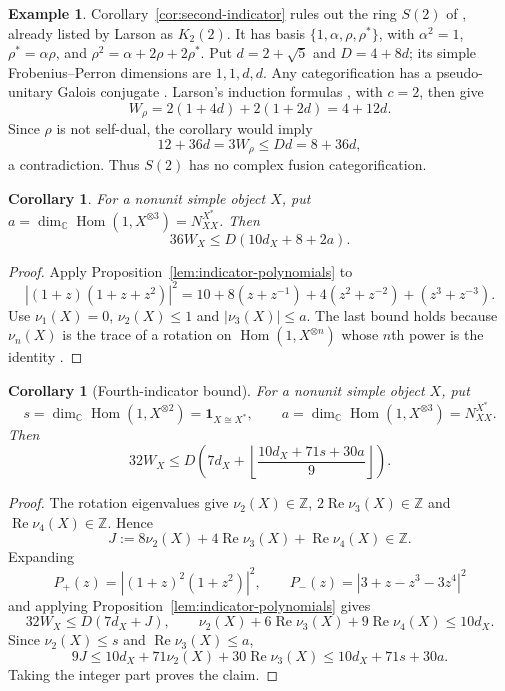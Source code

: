 \documentclass[11pt]{amsart}
\newtheorem{corollary}[theorem]{Corollary}
\theoremstyle{definition}
\newtheorem{example}[theorem]{Example}
\newcommand{\C}{\mathbb C}
\newcommand{\Z}{\mathbb Z}
\numberwithin{equation}{section}
\begin{document}
\begin{example}\label{ex:S(2)}
Corollary~\ref{cor:second-indicator} rules out the ring $S(2)$ of
\cite[\S4, Theorem~4.1]{EIP}, already listed by Larson
\cite[Theorem~1.1(6)]{Larson} as $K_2(2)$. It has basis
$\{1,\alpha,\rho,\rho^*\}$, with
$\alpha^2=1$, $\rho^*=\alpha\rho$, and
$\rho^2=\alpha+2\rho+2\rho^*$.
Put $d=2+\sqrt5$ and $D=4+8d$; its simple Frobenius--Perron
dimensions are $1,1,d,d$. Any categorification has a pseudo-unitary
Galois conjugate \cite[Lemma~3.1]{Schopieray}. Larson's induction
formulas \cite[Proposition~5.2]{Larson}, with $c=2$, then give
\[
 W_\rho=2(1+4d)+2(1+2d)=4+12d.
\]
Since $\rho$ is not self-dual, the corollary would imply
\[
 12+36d=3W_\rho\leq Dd=8+36d,
\]
a contradiction. Thus $S(2)$ has no complex fusion categorification.
\end{example}

\begin{corollary}\label{cor:third-indicator}
For a nonunit simple object $X$, put
$a=\dim_{\C}\operatorname{Hom}(1,X^{\otimes3})=N_{XX}^{X^*}$. Then
\[
 36W_X\leq D(10d_X+8+2a).
\]
\end{corollary}
\begin{proof}
Apply Proposition~\ref{lem:indicator-polynomials} to
\[
 |(1+z)(1+z+z^2)|^2
 =10+8(z+z^{-1})+4(z^2+z^{-2})+(z^3+z^{-3}).
\]
Use $\nu_1(X)=0$, $\nu_2(X)\leq1$ and $|\nu_3(X)|\leq a$.
The last bound holds because $\nu_n(X)$ is the trace of a rotation on
$\operatorname{Hom}(1,X^{\otimes n})$ whose $n$th power is the identity
\cite[Definition~3.1 and Theorem~5.1]{NgSchauenburgHigher}.
\end{proof}

\begin{corollary}[Fourth-indicator bound]\label{prop:fourth-indicator}
For a nonunit simple object $X$, put
\[
 s=\dim_{\C}\operatorname{Hom}(1,X^{\otimes2})=\mathbf1_{X\cong X^*},
 \qquad a=\dim_{\C}\operatorname{Hom}(1,X^{\otimes3})=N_{XX}^{X^*}.
\]
Then
\[
 32W_X\leq D\left(7d_X+
       \left\lfloor\frac{10d_X+71s+30a}{9}\right\rfloor\right).
\]
\end{corollary}
\begin{proof}
The rotation eigenvalues give $\nu_2(X)\in\Z$,
$2\operatorname{Re}\nu_3(X)\in\Z$ and
$\operatorname{Re}\nu_4(X)\in\Z$. Hence
\[
 J:=8\nu_2(X)+4\operatorname{Re}\nu_3(X)
                     +\operatorname{Re}\nu_4(X)\in\Z.
\]
Expanding
\[
 P_+(z)=|(1+z)^2(1+z^2)|^2,\qquad
 P_-(z)=|3+z-z^3-3z^4|^2
\]
and applying Proposition~\ref{lem:indicator-polynomials} gives
\[
 32W_X\leq D(7d_X+J),\qquad
 \nu_2(X)+6\operatorname{Re}\nu_3(X)+9\operatorname{Re}\nu_4(X)
 \leq10d_X.
\]
Since $\nu_2(X)\leq s$ and $\operatorname{Re}\nu_3(X)\leq a$,
\[
 9J\leq10d_X+71\nu_2(X)+30\operatorname{Re}\nu_3(X)
     \leq10d_X+71s+30a.
\]
Taking the integer part proves the claim.
\end{proof}
\end{document}
